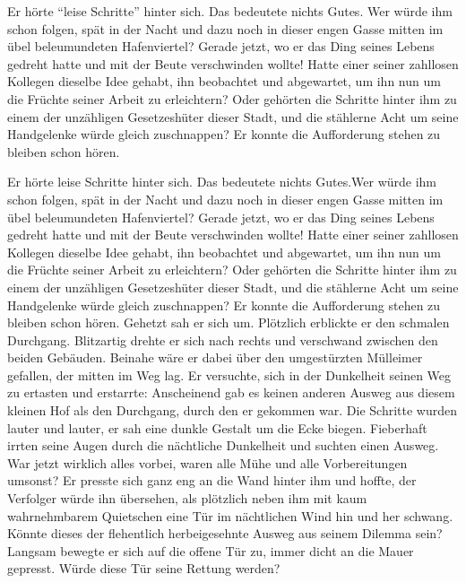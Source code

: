 Er hörte \enquote{leise Schritte} hinter sich. Das bedeutete
nichts Gutes. Wer würde ihm schon folgen, spät in der Nacht und
dazu noch in dieser engen Gasse mitten im übel beleumundeten
Hafenviertel? Gerade jetzt, wo er das Ding seines Lebens gedreht
hatte und mit der Beute verschwinden wollte! Hatte einer seiner
zahllosen Kollegen dieselbe Idee gehabt, ihn beobachtet und
abgewartet, um ihn nun um die Früchte seiner Arbeit zu
erleichtern? Oder gehörten die Schritte hinter ihm zu einem der
unzähligen Gesetzeshüter dieser Stadt, und die stählerne Acht um
seine Handgelenke würde gleich zuschnappen? Er konnte die
Aufforderung stehen zu bleiben
schon hören.

Er hörte leise Schritte hinter sich. Das bedeutete nichts Gutes.Wer würde ihm schon folgen,
spät in der Nacht und dazu noch in dieser engen Gasse mitten im übel beleumundeten
Hafenviertel? Gerade jetzt, wo er das Ding seines Lebens gedreht hatte und mit der Beute
verschwinden wollte! Hatte einer seiner zahllosen Kollegen dieselbe Idee gehabt, ihn
beobachtet und abgewartet, um ihn nun um die Früchte seiner Arbeit zu erleichtern?
Oder gehörten die Schritte hinter ihm zu einem der unzähligen Gesetzeshüter dieser
Stadt, und die stählerne Acht um seine Handgelenke würde gleich zuschnappen? Er
konnte die Aufforderung stehen zu bleiben schon hören. Gehetzt sah er sich um. Plötzlich
erblickte er den schmalen Durchgang. Blitzartig drehte er sich nach rechts und verschwand
zwischen den beiden Gebäuden. Beinahe wäre er dabei über den umgestürzten Mülleimer
gefallen, der mitten im Weg lag. Er versuchte, sich in der Dunkelheit seinen Weg zu
ertasten und erstarrte: Anscheinend gab es keinen anderen Ausweg aus diesem kleinen
Hof als den Durchgang, durch den er gekommen war. Die Schritte wurden lauter und
lauter, er sah eine dunkle Gestalt um die Ecke biegen. Fieberhaft irrten seine Augen durch
die nächtliche Dunkelheit und suchten einen Ausweg. War jetzt wirklich alles vorbei,
waren alle Mühe und alle Vorbereitungen umsonst? Er presste sich ganz eng an die Wand
hinter ihm und hoffte, der Verfolger würde ihn übersehen, als plötzlich neben ihm mit
kaum wahrnehmbarem Quietschen eine Tür im nächtlichen Wind hin und her schwang.
Könnte dieses der flehentlich herbeigesehnte Ausweg aus seinem Dilemma sein? Langsam
bewegte er sich auf die offene Tür zu, immer dicht an die Mauer gepresst. Würde diese
Tür seine Rettung werden?

%

